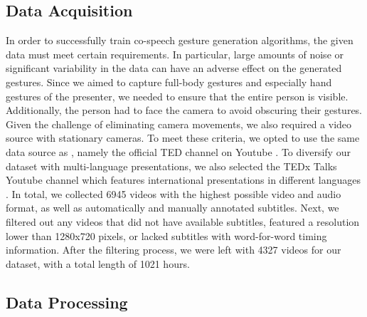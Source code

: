 \documentclass[sigconf]{acmart}
\begin{document}
\subsection{Data Acquisition}
In order to successfully train co-speech gesture generation algorithms, the given data must meet certain requirements. In particular, large amounts of noise or significant variability in the data can have an adverse effect on the generated gestures. Since we aimed to capture full-body gestures and especially hand gestures of the presenter, we needed to ensure that the entire person is visible. Additionally, the person had to face the camera to avoid obscuring their gestures. Given the challenge of eliminating camera movements, we also required a video source with stationary cameras. To meet these criteria, we opted to use the same data source as \citet{yoonRobotsLearnSocial2019a}, namely the official TED channel on Youtube \cite{ted_youtube}. To diversify our dataset with multi-language presentations, we also selected the TEDx Talks Youtube channel which features international presentations in different languages \cite{youtubeTEDxTalks}. In total, we collected 6945 videos with the highest possible video and audio format, as well as automatically and manually annotated subtitles. Next, we filtered out any videos that did not have available subtitles, featured a resolution lower than 1280x720 pixels, or lacked subtitles with word-for-word timing information. After the filtering process, we were left with 4327 videos for our dataset, with a total length of 1021 hours. 

\subsection{Data Processing}

\begin{table}[ht]
  \centering
  \caption{\textmd{\small{Overview of the BiGe dataset and the Shots of Interest (SoT)}}}
  \label{tab:table_groundtruth}
\end{table}
\end{document}
